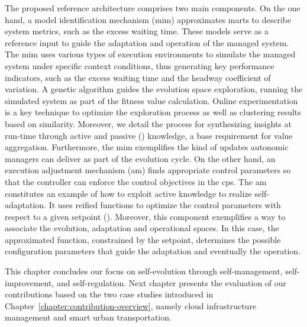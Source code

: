 The proposed reference architecture comprises two main components. On the one hand, a model identification mechanism (\gls{mim}) approximates \glspl{mart} to describe system metrics, such as the excess waiting time. These models serve as a reference input to guide the adaptation and operation of the managed system. The \gls{mim} uses various types of execution environments to simulate the managed system under specific context conditions, thus generating key performance indicators, such as the excess waiting time and the headway coefficient of variation. A genetic algorithm guides the evolution space exploration, running the simulated system as part of the fitness value calculation. Online experimentation is a key technique to optimize the exploration process as well as clustering results based on similarity. Moreover, we detail the process for synthesizing insights at run-time through active and passive () knowledge, a base requirement for value aggregation. Furthermore, the \gls{mim} exemplifies the kind of updates autonomic managers can deliver as part of the evolution cycle. On the other hand, an execution adjustment mechanism (\gls{am}) finds appropriate control parameters so that the controller can enforce the control objectives in the \gls{cps}. The \gls{am} constitutes an example of how to exploit active knowledge to realize self-adaptation. It uses reified functions to optimize the control parameters with respect to a given setpoint (). Moreover, this component exemplifies a way to associate the evolution, adaptation and operational spaces. In this case, the approximated function, constrained by the setpoint, determines the possible configuration parameters that guide the adaptation and eventually the operation.

This chapter concludes our focus on self-evolution through self-management, self-improvement, and self-regulation. Next chapter presents the evaluation of our contributions based on the two case studies introduced in Chapter~\ref{chapter:contribution-overview}, namely cloud infrastructure management and smart urban transportation.
